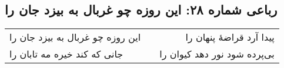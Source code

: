\begin{center}
\section*{رباعی شماره ۲۸: این روزه چو غربال به بیزد جان را}
\label{sec:0028}
\begin{longtable}{l p{0.5cm} r}
این روزه چو غربال به بیزد جان را
&&
پیدا آرد قراضهٔ پنهان را
\\
جانی که کند خیره مه تابان را
&&
بی‌پرده شود نور دهد کیوان را
\\
\end{longtable}
\end{center}
